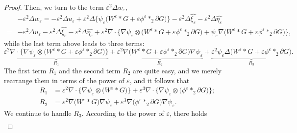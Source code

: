 \documentclass[13pt,CJK]{article}
\theoremstyle{plain}                       %
\theoremstyle{remark}
\numberwithin{equation}{section}
\begin{document}
\begin{proof}
Then, we turn to the term $\varepsilon^2\Delta w_{\varepsilon}$,
\begin{equation}\label{f:4.1}
\begin{aligned}
&-\varepsilon^2\Delta w_{\varepsilon}=
-\varepsilon^2\Delta u_{\varepsilon}+\varepsilon^2\Delta\bigg\{
\psi_{\varepsilon}\big(W^{\varepsilon}\ast G+\varepsilon\phi^{\varepsilon}\ast_2\partial G\big)
\bigg\}
-\varepsilon^2\Delta\hat{\xi_{\varepsilon}}
-\varepsilon^2\Delta\hat{\eta_{\varepsilon}}\\
=&-\varepsilon^2\Delta u_{\varepsilon}
-\varepsilon^2\Delta\hat{\xi_{\varepsilon}}
-\varepsilon^2\Delta\hat{\eta_{\varepsilon}}
+\varepsilon^2\nabla\cdot
\bigg\{
\nabla\psi_{\varepsilon}\otimes\big(W^{\varepsilon}\ast G+\varepsilon\phi^{\varepsilon}\ast_2\partial G\big)+\psi_{\varepsilon}\nabla \big(W^{\varepsilon}\ast G+\varepsilon\phi^{\varepsilon}\ast_2\partial G\big)
\bigg\},
\end{aligned}
\end{equation}
while the last term above leads to three terms:
\begin{equation*}
\underbrace{\varepsilon^2\nabla\cdot
\bigg\{
\nabla\psi_{\varepsilon}\otimes\big(W^{\varepsilon}\ast G+\varepsilon\phi^{\varepsilon}\ast_2\partial G\big)
\bigg\}}_{R_1}
+\underbrace{\varepsilon^2\nabla
\big(W^{\varepsilon}\ast G+\varepsilon\phi^{\varepsilon}\ast_2\partial G\big)\nabla\psi_{\varepsilon}}_{R_2}
+\underbrace{\varepsilon^2\psi_{\varepsilon}
\Delta\big(W^{\varepsilon}\ast G+\varepsilon\phi^{\varepsilon}\ast_2\partial G\big)}_{R_3}.
\end{equation*}
The first term $R_1$ and the second term $R_2$ are quite easy, and we merely rearrange
them in terms of the power of $\varepsilon$, and it follows that
\begin{equation*}
\begin{aligned}
 R_1 &= \varepsilon^2\nabla\cdot\Big\{
 \nabla\psi_\varepsilon\otimes\big(W^\varepsilon\ast G\big)\Big\}
 + \varepsilon^3\nabla\cdot\Big\{
 \nabla\psi_\varepsilon\otimes\big(\phi^\varepsilon\ast_2\partial G\big)\Big\};\\
 R_2 &= \varepsilon^2\nabla\big(W^\varepsilon\ast G\big)\nabla\psi_\varepsilon
 +\varepsilon^3\nabla\big(\phi^\varepsilon\ast_2\partial G\big)\nabla\psi_\varepsilon.
\end{aligned}
\end{equation*}
We continue to handle $R_3$. According to the power of $\varepsilon$, there holds
\begin{equation*}
\begin{aligned}

\end{aligned}
\end{equation*}
\end{proof}
\end{document}
